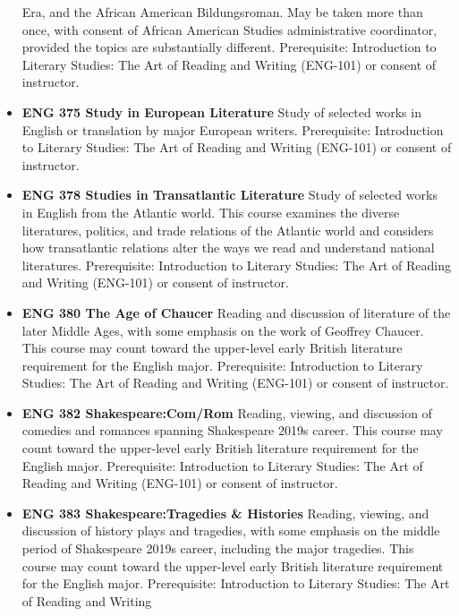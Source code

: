 \documentclass[
  letterpaper,
]{scrbook}
\begin{document}
\begin{itemize}
  Era, and the African American Bildungsroman. May be taken more than
  once, with consent of African American Studies administrative
  coordinator, provided the topics are substantially different.
  Prerequisite: Introduction to Literary Studies: The Art of Reading and
  Writing (ENG-101) or consent of instructor.\\
\item
  \textbf{ENG 375 Study in European Literature} Study of selected works
  in English or translation by major European writers. Prerequisite:
  Introduction to Literary Studies: The Art of Reading and Writing
  (ENG-101) or consent of instructor.\\
\item
  \textbf{ENG 378 Studies in Transatlantic Literature} Study of selected
  works in English from the Atlantic world. This course examines the
  diverse literatures, politics, and trade relations of the Atlantic
  world and considers how transatlantic relations alter the ways we read
  and understand national literatures. Prerequisite: Introduction to
  Literary Studies: The Art of Reading and Writing (ENG-101) or consent
  of instructor.\\
\item
  \textbf{ENG 380 The Age of Chaucer} Reading and discussion of
  literature of the later Middle Ages, with some emphasis on the work of
  Geoffrey Chaucer. This course may count toward the upper-level early
  British literature requirement for the English major. Prerequisite:
  Introduction to Literary Studies: The Art of Reading and Writing
  (ENG-101) or consent of instructor.\\
\item
  \textbf{ENG 382 Shakespeare:Com/Rom} Reading, viewing, and discussion
  of comedies and romances spanning Shakespeare 2019s career. This
  course may count toward the upper-level early British literature
  requirement for the English major. Prerequisite: Introduction to
  Literary Studies: The Art of Reading and Writing (ENG-101) or consent
  of instructor.\\
\item
  \textbf{ENG 383 Shakespeare:Tragedies \& Histories} Reading, viewing,
  and discussion of history plays and tragedies, with some emphasis on
  the middle period of Shakespeare 2019s career, including the major
  tragedies. This course may count toward the upper-level early British
  literature requirement for the English major. Prerequisite:
  Introduction to Literary Studies: The Art of Reading and Writing

\end{itemize}
\end{document}
